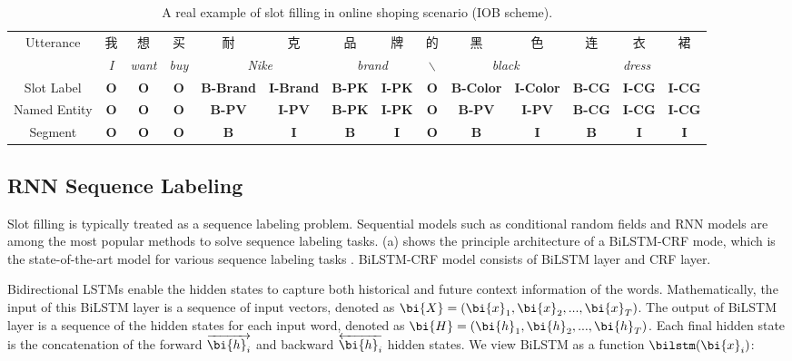 \begin{table*}[htbp]
	\caption{A real example of slot filling in online shoping scenario (IOB scheme).}
	\label{tab:slot-filling-demo}
	\centering
	\scriptsize
	\begin{tabular}{c|c|c|c|c|c|c|c|c|c|c|c|c|c}
		\toprule
		\multirow{2}{*}{Utterance} & 我 & 想 & 买 & 耐 & 克 & 品 & 牌 & 的 & 黑 & 色 & 连 & 衣 & 裙 \\
		\cmidrule{2-14}
		& \em{I} & \em{want} & \em{buy} & \multicolumn{2}{c|}{\em{Nike}} & \multicolumn{2}{c|}{\em{brand}} & $\backslash$  & \multicolumn{2}{c|}{\em{black}} & \multicolumn{3}{c}{\em{dress}} \\
		\midrule
		Slot Label & \textbf{O} & \textbf{O} & \textbf{O} & \textbf{B-Brand} & \textbf{I-Brand} & \textbf{B-PK} & \textbf{I-PK} & \textbf{O} & \textbf{B-Color} & \textbf{I-Color} & \textbf{B-CG} & \textbf{I-CG} & \textbf{I-CG} \\
		\midrule
		Named Entity & \textbf{O} & \textbf{O} & \textbf{O} & \textbf{B-PV} & \textbf{I-PV} & \textbf{B-PK} & \textbf{I-PK} & \textbf{O} & \textbf{B-PV} & \textbf{I-PV} & \textbf{B-CG} & \textbf{I-CG} & \textbf{I-CG} \\
		\midrule
		Segment & \textbf{O} & \textbf{O} & \textbf{O} & \textbf{B} & \textbf{I} & \textbf{B} & \textbf{I} & \textbf{O} & \textbf{B} & \textbf{I} & \textbf{B} & \textbf{I} & \textbf{I} \\
		\bottomrule
	\end{tabular}
	\vspace{-10pt}
\end{table*}

\subsection{RNN Sequence Labeling}
\label{sec:rnn_sequence_labeling}
Slot filling is typically treated as a sequence labeling problem. 
Sequential models such as  conditional
random fields \cite{raymond2007generative} and RNN models \cite{yao2014spoken,mesnil2015using} are among
the most popular methods to solve sequence labeling
tasks. 
(a) 
shows the principle architecture of a BiLSTM-CRF mode,
which is the state-of-the-art model for various sequence labeling tasks \cite{huang2015bidirectional,reimers2017optimal}.
BiLSTM-CRF model consists of BiLSTM layer and CRF layer. 

Bidirectional LSTMs enable the
hidden states to capture both historical and future
context information of the words.
Mathematically, the input of this BiLSTM layer
is a sequence of input vectors,
denoted as $\bi{X}=(\bi{x}_1, \bi{x}_2, ..., \bi{x}_T)$.
The output of BiLSTM layer is a sequence of the hidden
states for each input word, denoted
as $\bi{H}=(\bi{h}_1, \bi{h}_2, ..., \bi{h}_T)$.
Each final hidden state is the concatenation of the forward
$\overrightarrow{\bi{h}_i}$ and backward $\overleftarrow{\bi{h}_i}$ hidden states.
We view BiLSTM as a function $\bilstm(\bi{x}_i)$:

